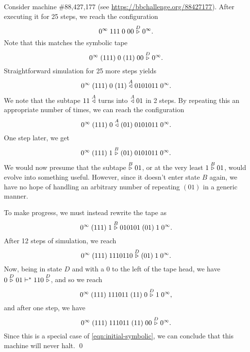 \begin{example}
Consider machine \#88,427,177 (see \url{https://bbchallenge.org/88427177}).
After executing it for 25 steps, we reach the configuration
\begin{equation}
    0^\infty\; 111\; 0\; 00 \stackrel{D}\triangleright 0^\infty.
\end{equation}
Note that this matches the symbolic tape
\begin{equation}
    \label{eqn:initial-symbolic}
    0^\infty\; (111)\; 0\; (11)\; 00 \stackrel{D}\triangleright 0^\infty.
\end{equation}
Straightforward simulation for 25 more steps yields
\begin{equation}
    0^\infty\; (111)\; 0\; (11) \stackrel{A}\triangleleft 0101011\; 0^\infty.
\end{equation}
We note that the subtape $11 \stackrel{A}\triangleleft$ turns into $\stackrel{A}\triangleleft 01$ in 2 steps. By repeating
this an appropriate number of times, we can reach the configuration
\begin{equation}
    0^\infty\; (111)\; 0 \stackrel{A}\triangleleft (01)\; 0101011\; 0^\infty.
\end{equation}
One step later, we get
\begin{equation}
    0^\infty\; (111)\; 1 \stackrel{B}\triangleright (01)\; 0101011\; 0^\infty.
\end{equation}
We would now presume that the subtape $\stackrel{B}\triangleright 01$, or at the very least $1 \stackrel{B}\triangleright 01$,
would evolve into something
useful. However, since it doesn't enter state $B$ again, we have no hope of
handling an arbitrary number of repeating $(01)$ in a generic manner.

To make progress, we must instead rewrite the tape as
\begin{equation}
    0^\infty\; (111)\; 1 \stackrel{B}\triangleright 010101\; (01)\; 1\; 0^\infty.
\end{equation}
After 12 steps of simulation, we reach
\begin{equation}
    0^\infty\; (111)\; 1110110 \stackrel{D}\triangleright (01)\; 1\; 0^\infty.
\end{equation}
Now, being in state $D$ and with a 0 to the left of the tape head, we have
$0 \stackrel{D}\triangleright 01 \vdash^* 110 \stackrel{D}\triangleright$, and so we reach
\begin{equation}
    0^\infty\; (111)\; 111011\; (11)\; 0 \stackrel{D}\triangleright 1\; 0^\infty,
\end{equation}
and after one step, we have
\begin{equation}
    0^\infty\; (111)\; 111011\; (11)\; 00 \stackrel{D}\triangleright 0^\infty.
\end{equation}
Since this is a special case of \eqref{eqn:initial-symbolic}, we can
conclude that this machine will never halt. \qed

\end{example}

